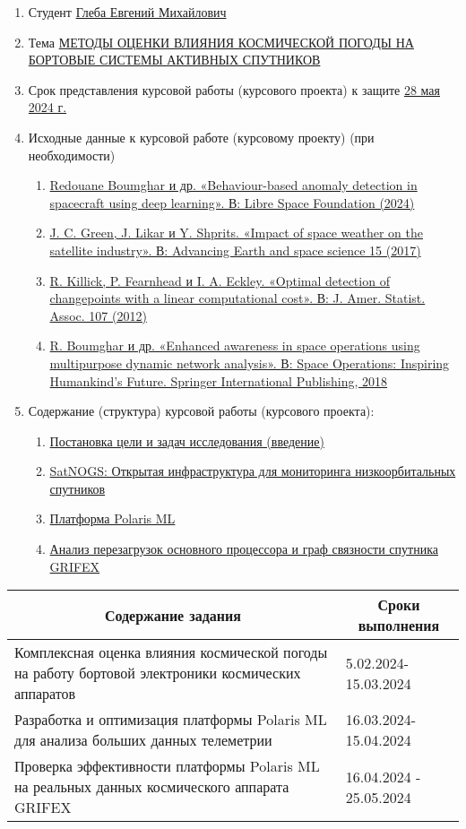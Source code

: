 \documentclass[14pt, a4paper]{extreport}
\begin{document}
\noindent 
\begin{enumerate}
\item {Студент} \ul{Глеба Евгений Михайлович}
\item {Тема} \ul{МЕТОДЫ ОЦЕНКИ ВЛИЯНИЯ КОСМИЧЕСКОЙ ПОГОДЫ НА БОРТОВЫЕ СИСТЕМЫ АКТИВНЫХ СПУТНИКОВ} 
\item {Срок представления курсовой работы (курсового проекта) к защите} \ul{28 мая 2024 г.} 
\item {Исходные данные к курсовой работе (курсовому проекту)} (при необходимости)
    \begin{enumerate}[label=\arabic{enumi}.\arabic*]
        \item \ul{Redouane Boumghar и др. «Behaviour-based anomaly detection in spacecraft
        using deep learning». В: Libre Space Foundation (2024)} 
        \item \ul{J. C. Green, J. Likar и Y. Shprits. «Impact of space weather on the satellite
        industry». В: Advancing Earth and space science 15 (2017)} 
        \item \ul{R. Killick, P. Fearnhead и I. A. Eckley. «Optimal detection of changepoints
        with a linear computational cost». В: J. Amer. Statist. Assoc. 107 (2012)} 
        \item \ul{R. Boumghar и др. «Enhanced awareness in space operations using multipurpose dynamic network analysis». В: Space Operations: Inspiring Humankind’s Future. Springer International Publishing, 2018} 
    \end{enumerate}
\item {Содержание (структура) курсовой работы (курсового проекта):}
    \begin{enumerate}[label=\arabic{enumi}.\arabic*]
        \item \ul{Постановка цели и задач исследования (введение)} 
        \item \ul{SatNOGS: Открытая инфраструктура для мониторинга низкоорбитальных спутников} 
        \item \ul{Платформа Polaris ML} 
        \item \ul{Анализ перезагрузок основного процессора и граф связности спутника GRIFEX} 
    \end{enumerate}
\end{enumerate}

\vspace{2em}

\noindent
\begin{tabularx}{\textwidth}{@{}|X|X@{}|}
    \hline
    \multicolumn{1}{|c|}{\textbf{Содержание задания}} & \multicolumn{1}{c|}{\textbf{Сроки выполнения}} \\
    \hline
    Комплексная оценка влияния космической погоды на работу бортовой электроники космических аппаратов & 5.02.2024-15.03.2024 \\
    \hline
    Разработка и оптимизация платформы Polaris ML для анализа больших данных телеметрии & 16.03.2024-15.04.2024 \\
    \hline
    Проверка эффективности платформы Polaris ML на реальных данных космического аппарата GRIFEX & 16.04.2024 - 25.05.2024 \\
    \hline
\end{tabularx}
\end{document}
